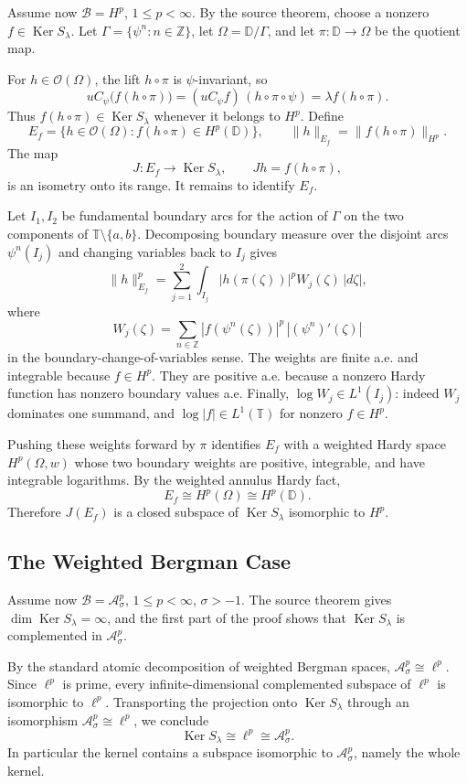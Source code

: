 \documentclass[11pt]{article}
\newcommand{\D}{\mathbb D}
\newcommand{\T}{\mathbb T}
\newcommand{\Z}{\mathbb Z}
\newcommand{\B}{\mathcal B}
\newcommand{\A}{\mathcal A}
\newcommand{\Ker}{\operatorname{Ker}}
\begin{document}
Assume now \(\B=H^p\), \(1\le p<\infty\).  By the source theorem, choose a
nonzero \(f\in\Ker S_\lambda\).  Let
\(\Gamma=\{\psi^n:n\in\Z\}\), let \(\Omega=\D/\Gamma\), and let
\(\pi:\D\to\Omega\) be the quotient map.

For \(h\in\mathcal O(\Omega)\), the lift \(h\circ\pi\) is \(\psi\)-invariant,
so
\[
  uC_\psi\bigl(f(h\circ\pi)\bigr)
  =(uC_\psi f)\,(h\circ\pi\circ\psi)
  =\lambda f(h\circ\pi).
\]
Thus \(f(h\circ\pi)\in\Ker S_\lambda\) whenever it belongs to \(H^p\).
Define
\[
  E_f=\{h\in\mathcal O(\Omega): f(h\circ\pi)\in H^p(\D)\},
  \qquad
  \|h\|_{E_f}=\|f(h\circ\pi)\|_{H^p}.
\]
The map
\[
  J:E_f\to\Ker S_\lambda,\qquad Jh=f(h\circ\pi),
\]
is an isometry onto its range.  It remains to identify \(E_f\).

Let \(I_1,I_2\) be fundamental boundary arcs for the action of \(\Gamma\) on
the two components of \(\T\setminus\{a,b\}\).  Decomposing boundary measure
over the disjoint arcs \(\psi^n(I_j)\) and changing variables back to \(I_j\)
gives
\[
  \|h\|_{E_f}^p
   =\sum_{j=1}^2\int_{I_j}|h(\pi(\zeta))|^p W_j(\zeta)\,|d\zeta|,
\]
where
\[
  W_j(\zeta)=\sum_{n\in\Z}
      |f(\psi^n(\zeta))|^p\,|(\psi^n)'(\zeta)|
\]
in the boundary-change-of-variables sense.  The weights are finite a.e. and
integrable because \(f\in H^p\).  They are positive a.e. because a nonzero
Hardy function has nonzero boundary values a.e.  Finally,
\(\log W_j\in L^1(I_j)\): indeed \(W_j\) dominates one summand, and
\(\log |f|\in L^1(\T)\) for nonzero \(f\in H^p\).

Pushing these weights forward by \(\pi\) identifies \(E_f\) with a weighted
Hardy space \(H^p(\Omega,w)\) whose two boundary weights are positive,
integrable, and have integrable logarithms.  By the weighted annulus Hardy
fact,
\[
  E_f\cong H^p(\Omega)\cong H^p(\D).
\]
Therefore \(J(E_f)\) is a closed subspace of \(\Ker S_\lambda\) isomorphic to
\(H^p\).

\subsection*{The Weighted Bergman Case}

Assume now \(\B=\A_\sigma^p\), \(1\le p<\infty\), \(\sigma>-1\).  The source
theorem gives \(\dim\Ker S_\lambda=\infty\), and the first part of the proof
shows that \(\Ker S_\lambda\) is complemented in \(\A_\sigma^p\).

By the standard atomic decomposition of weighted Bergman spaces,
\(\A_\sigma^p\cong\ell^p\).  Since \(\ell^p\) is prime, every
infinite-dimensional complemented subspace of \(\ell^p\) is isomorphic to
\(\ell^p\).  Transporting the projection onto \(\Ker S_\lambda\) through an
isomorphism \(\A_\sigma^p\cong\ell^p\), we conclude
\[
  \Ker S_\lambda\cong\ell^p\cong\A_\sigma^p.
\]
In particular the kernel contains a subspace isomorphic to \(\A_\sigma^p\),
namely the whole kernel.
\end{document}
